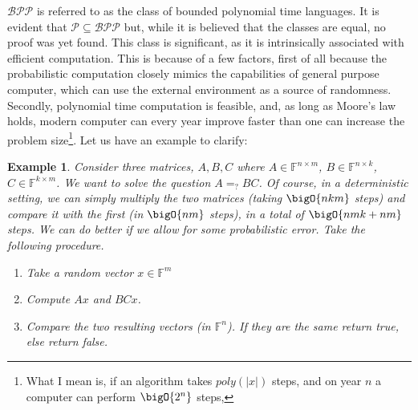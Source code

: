 \documentclass{article}
\newtheorem{example}{Example}
\begin{document}
$\mathcal{BPP}$ is referred to as the class of bounded polynomial time languages. It is evident that $\mathcal{P} \subseteq \mathcal{BPP}$ but, while it is believed that the classes are equal, no proof was yet found. This class is significant, as it is intrinsically associated with efficient computation. This is because of a few factors, first of all because the probabilistic computation closely mimics the capabilities of general purpose computer, which can use the external environment as a source of randomness. Secondly, polynomial time computation is feasible, and, as long as Moore's law holds, modern computer can every year improve faster than one can increase the problem size\footnote{What I mean is, if an algorithm takes $poly(|x|)$ steps, and on year $n$ a computer can perform $\bigO{2^n}$ steps, }. Let us have an example to clarify:
\begin{example}
Consider three matrices, $A, B, C$ where $A \in \mathbb{F}^{n \times m}$, $B \in \mathbb{F}^{n \times k}$, $C \in \mathbb{F}^{k \times m}$. We want to solve the question $A =_? B C$. Of course, in a deterministic setting, we can simply multiply the two matrices (taking $\bigO{nkm}$ steps) and compare it with the first (in $\bigO{nm}$ steps), in a total of $\bigO{nmk + nm}$ steps. We can do better if we allow for some probabilistic error. Take the following procedure.
\begin{enumerate}
    \item Take a random vector $x \in \mathbb{F}^m$
    \item Compute $Ax$ and $BCx$.
    \item Compare the two resulting vectors (in $\mathbb{F}^n$). If they are the same return true, else return false. 
\end{enumerate}

\end{example}
\end{document}
